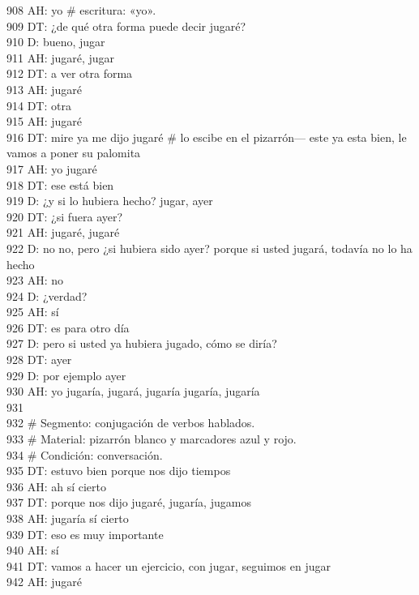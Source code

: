 908 AH: yo \# escritura: «yo».\\
909 DT: ¿de qué otra forma puede decir jugaré?\\
910 D: bueno, jugar\\
911 AH: jugaré, jugar\\
912 DT: a ver otra forma\\
913 AH: jugaré\\
914 DT: otra\\
915 AH: jugaré\\
916 DT: mire ya me dijo jugaré \# lo escibe en el pizarrón--- este ya esta bien, le vamos a poner su palomita\\
917 AH: yo jugaré\\
918 DT: ese está bien\\
919 D: ¿y si lo hubiera hecho? jugar, ayer\\
920 DT: ¿si fuera ayer?\\
921 AH: jugaré, jugaré\\
922 D: no no, pero ¿si hubiera sido ayer? porque si usted jugará, todavía no lo ha hecho\\
923 AH: no\\
924 D: ¿verdad?\\
925 AH: sí\\
926 DT: es para otro día\\
927 D: pero si usted ya hubiera jugado, cómo se diría?\\
928 DT: ayer\\
929 D: por ejemplo ayer\\
930 AH: yo jugaría, jugará, jugaría jugaría, jugaría\\
931 \\
932 \# Segmento: conjugación de verbos hablados.\\
933 \# Material: pizarrón blanco y marcadores azul y rojo.\\
934 \# Condición: conversación.\\
935 DT: estuvo bien porque nos dijo tiempos\\
936 AH: ah sí cierto\\
937 DT: porque nos dijo jugaré, jugaría, jugamos\\
938 AH: jugaría sí cierto\\
939 DT: eso es muy importante\\
940 AH: sí\\
941 DT: vamos a hacer un ejercicio, con jugar, seguimos en jugar\\
942 AH: jugaré\\
